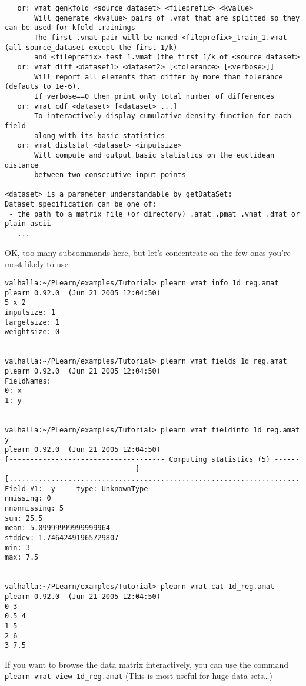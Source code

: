 \documentclass[11pt]{book}
\begin{document}
\begin{verbatim}
   or: vmat genkfold <source_dataset> <fileprefix> <kvalue>
       Will generate <kvalue> pairs of .vmat that are splitted so they can be used for kfold trainings
       The first .vmat-pair will be named <fileprefix>_train_1.vmat (all source_dataset except the first 1/k)
       and <fileprefix>_test_1.vmat (the first 1/k of <source_dataset>
   or: vmat diff <dataset1> <dataset2> [<tolerance> [<verbose>]]
       Will report all elements that differ by more than tolerance (defauts to 1e-6).
       If verbose==0 then print only total number of differences
   or: vmat cdf <dataset> [<dataset> ...]
       To interactively display cumulative density function for each field
       along with its basic statistics
   or: vmat diststat <dataset> <inputsize>
       Will compute and output basic statistics on the euclidean distance
       between two consecutive input points

<dataset> is a parameter understandable by getDataSet:
Dataset specification can be one of:
 - the path to a matrix file (or directory) .amat .pmat .vmat .dmat or plain ascii
 - ... 
\end{verbatim}

OK, too many subcommands here, but let's concentrate on the few ones you're most likely to use:

\begin{verbatim}
valhalla:~/PLearn/examples/Tutorial> plearn vmat info 1d_reg.amat
plearn 0.92.0  (Jun 21 2005 12:04:50)
5 x 2
inputsize: 1
targetsize: 1
weightsize: 0


valhalla:~/PLearn/examples/Tutorial> plearn vmat fields 1d_reg.amat
plearn 0.92.0  (Jun 21 2005 12:04:50)
FieldNames:
0: x
1: y


valhalla:~/PLearn/examples/Tutorial> plearn vmat fieldinfo 1d_reg.amat y
plearn 0.92.0  (Jun 21 2005 12:04:50)
[------------------------------------- Computing statistics (5) -------------------------------------]
[....................................................................................................]
Field #1:  y     type: UnknownType
nmissing: 0
nnonmissing: 5
sum: 25.5
mean: 5.09999999999999964
stddev: 1.74642491965729807
min: 3
max: 7.5


valhalla:~/PLearn/examples/Tutorial> plearn vmat cat 1d_reg.amat
plearn 0.92.0  (Jun 21 2005 12:04:50)
0 3
0.5 4
1 5
2 6
3 7.5
\end{verbatim}

If you want to browse the data matrix interactively, you can use the
command \verb!plearn vmat view 1d_reg.amat! (This is most useful for huge data sets\ldots)
\end{document}
